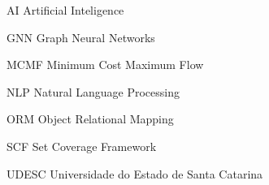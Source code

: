 
\listoffigures*
\cleardoublepage



\listoftables*
\cleardoublepage

\begin{siglas}
	\item[AI] Artificial Inteligence
	\item[GNN] Graph Neural Networks
	\item[MCMF] Minimum Cost Maximum Flow
    \item[NLP] Natural Language Processing
	\item[ORM] Object Relational Mapping
	\item[SCF] Set Coverage Framework
	\item[UDESC] Universidade do Estado de Santa Catarina
\end{siglas}




